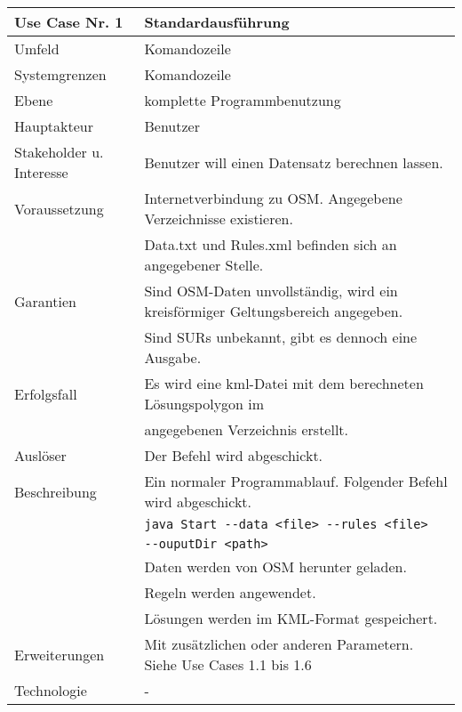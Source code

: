 \begin{tabular}{| l | l |}
 \hline
 \textbf{Use Case Nr. 1} & Standardausführung\\
 \hline
 Umfeld & Komandozeile\\
 \hline
 Systemgrenzen & Komandozeile\\
 \hline
 Ebene & komplette Programmbenutzung\\
 \hline
 Hauptakteur & Benutzer\\
 \hline
 Stakeholder u. Interesse & Benutzer will einen Datensatz berechnen lassen.\\
 \hline
 Voraussetzung & Internetverbindung zu OSM. Angegebene Verzeichnisse existieren.\\
	      & Data.txt und Rules.xml befinden sich an angegebener Stelle. \\
 \hline
 Garantien & Sind OSM-Daten unvollständig, wird ein kreisförmiger Geltungsbereich angegeben.\\
	  & Sind SURs unbekannt, gibt es dennoch eine Ausgabe.\\
 \hline
 Erfolgsfall & Es wird eine kml-Datei mit dem berechneten Lösungspolygon im\\
	    & angegebenen Verzeichnis erstellt.\\
 \hline
 Auslöser & Der Befehl wird abgeschickt.\\
 \hline
 Beschreibung & Ein normaler Programmablauf. Folgender Befehl wird abgeschickt.\\
	    & \verb|java Start --data <file> --rules <file>|\\
	    & \hspace{24pt} \verb|--ouputDir <path>|\\
	    & Daten werden von OSM herunter geladen.\\
	    & Regeln werden angewendet.\\
	    & Lösungen werden im KML-Format gespeichert.\\
 \hline
 Erweiterungen & Mit zusätzlichen oder anderen Parametern. Siehe Use Cases 1.1 bis 1.6\\
 \hline
 Technologie & -\\
 \hline
\end{tabular}
\\[12pt]
